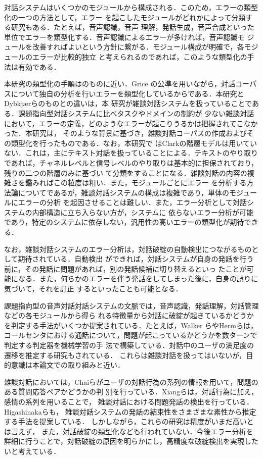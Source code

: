 \documentclass[japanese]{jnlp_1.4}
\begin{document}
対話システムはいくつかのモジュールから構成される．このため，エラーの類型化の一つの方法として，エラー
を起こしたモジュールがどれかによって分類する研究もある\cite{ward2005root}．たとえば，音声認識，音声
理解，発話生成，音声合成といった単位でエラーを類型化する．音声認識によるエラーが多ければ，音声認識モ
ジュールを改善すればよいという方針に繋がる．モジュール構成が明確で，各モジュールのエラーが比較的独立
と考えられるのであれば，このような類型化の手法は有効である．

本研究の類型化の手順は\cite{dybkjaer1996grice}のものに近い．Grice の公準を用いながら，対話コーパ
スについて独自の分析を行いエラーを類型化しているからである．本研究とDybkj{\ae}rらのものとの違いは，本
研究が雑談対話システムを扱っていることである．課題指向型対話システムに比べタスクやドメインの制約が
少ない雑談対話において，エラーの定義，どのようなエラーが起こりうるかは把握されてこなかった．本研究は，
そのような背景に基づき，雑談対話コーパスの作成およびその類型化を行ったものである．なお，本研究で
はClarkの階層モデルは用いていない．これは，主にテキスト対話を扱っていることによる．テキストのやり取り
であれば，チャネルレベルと信号レベルのやり取りは基本的に担保されており，残りの二つの階層のみに基づい
て分類をすることになる．雑談対話の内容の複雑さを鑑みればこの粒度は粗い．また，モジュールごとにエラー
を分析する方法論についてであるが，雑談対話システムの構成は複雑であり，単体のモジュールにエラーの分析
を起因させることは難しい．また，エラー分析として対話システムの内部構造に立ち入らない方が，システムに
依らないエラー分析が可能であり，特定のシステムに依存しない，汎用性の高いエラーの類型化が期待できる．

なお，雑談対話システムのエラー分析は，対話破綻の自動検出につながるものとして期待されている．自動検出
ができれば，対話システムが自身の発話を行う前に，その発話に問題があれば，別の発話候補に切り替えるといっ
たことが可能になる．また，何らかのエラーを伴う発話をしてしまった後に，自身の誤りに気づいて，それを訂正
するといったことも可能となる．

課題指向型の音声対話対話システムの文脈では，音声認識，発話理解，対話管理などの各モジュールから得ら
れる特徴量から対話に破綻が起きているかどうかを判定する手法がいくつか提案されている．たとえば，Walker
ら\cite{walker2000}やHermら\cite{herm2008calls}は，
コールセンタにおける通話について，問題が起こっているかどうかを数ターンで判定する判定器を機械学習の手
法で構築している．対話中のユーザの満足度の遷移を推定する研究もされている\cite{schmitt2011modeling}．
これらは雑談対話を扱ってはいないが，目的意識は本論文での取り組みと近い．

雑談対話においては，Chaiらがユーザの対話行為の系列の情報を用いて，問題のある質問応答ペアかどうかの判
別を行っている\cite{chai2006towards}．Xiangらは，対話行為に加え，感情の系列を用いることで，
雑談対話における問題発話の検出を行っている\cite{xiang2014problematic}．
Higashinakaらも，
雑談対話システムの発話の結束性をさまざまな素性から推定する手法を提案している\cite{higashinaka2014evaluating}．
しかしながら，これらの研究は精度がいまだ高いとは言えず，
また，対話破綻の類型化なども行われていない．今後エラー分析を詳細に行うことで，対話破綻の原因を明らかにし，高精度な破綻検出を実現したいと考えている．
\end{document}
